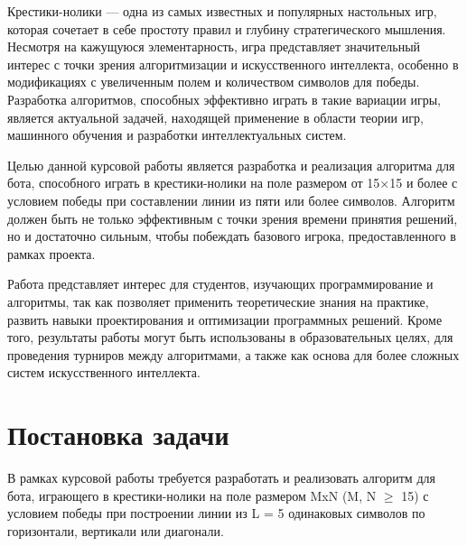 \documentclass[a4paper]{article}
\begin{document}
Крестики-нолики — одна из самых известных и популярных настольных игр, которая сочетает в себе простоту правил и глубину стратегического мышления. Несмотря на кажущуюся элементарность, игра представляет значительный интерес с точки зрения алгоритмизации и искусственного интеллекта, особенно в модификациях с увеличенным полем и количеством символов для победы. Разработка алгоритмов, способных эффективно играть в такие вариации игры, является актуальной задачей, находящей применение в области теории игр, машинного обучения и разработки интеллектуальных систем.

Целью данной курсовой работы является разработка и реализация алгоритма для бота, способного играть в крестики-нолики на поле размером от 15×15 и более с условием победы при составлении линии из пяти или более символов. Алгоритм должен быть не только эффективным с точки зрения времени принятия решений, но и достаточно сильным, чтобы побеждать базового игрока, предоставленного в рамках проекта.

Работа представляет интерес для студентов, изучающих программирование и алгоритмы, так как позволяет применить теоретические знания на практике, развить навыки проектирования и оптимизации программных решений. Кроме того, результаты работы могут быть использованы в образовательных целях, для проведения турниров между алгоритмами, а также как основа для более сложных систем искусственного интеллекта.
\clearpage

\section{Постановка задачи}

В рамках курсовой работы требуется разработать и реализовать алгоритм для бота, играющего в крестики-нолики на поле размером MxN (M, N $\geq$ 15) с условием победы при построении линии из L = 5 одинаковых символов по горизонтали, вертикали или диагонали.
\end{document}
